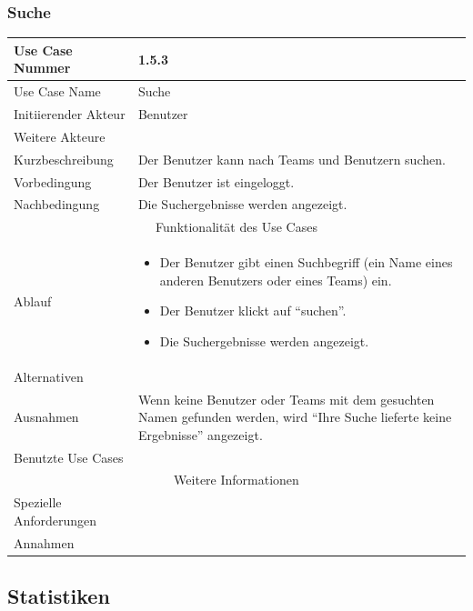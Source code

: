 \documentclass[10pt,a4paper]{article}
\begin{document}
\subsubsection{Suche}
	\begin{tabular}{|l|p{.5\linewidth}|}
	\hline Use Case Nummer & 1.5.3 \\ 
	\hline Use Case Name & Suche \\ 
	\hline Initiierender Akteur & Benutzer \\
	\hline Weitere Akteure &  \\
	\hline Kurzbeschreibung & Der Benutzer kann nach Teams und Benutzern suchen. \\
	\hline Vorbedingung & Der Benutzer ist eingeloggt. \\
	\hline Nachbedingung & Die Suchergebnisse werden angezeigt. \\
	\hline \multicolumn{2}{|c|}{Funktionalität des Use Cases}\\
	\hline Ablauf & \begin{itemize}
		\item Der Benutzer gibt einen Suchbegriff (ein Name eines anderen Benutzers oder eines Teams) ein.
		\item Der Benutzer klickt auf ``suchen''.
		\item Die Suchergebnisse werden angezeigt.
	\end{itemize} \\
	\hline Alternativen &  \\
	\hline Ausnahmen & Wenn keine Benutzer oder Teams mit dem gesuchten Namen gefunden werden, wird ``Ihre Suche lieferte keine Ergebnisse'' angezeigt. \\
	\hline Benutzte Use Cases &  \\
	\hline \multicolumn{2}{|c|}{Weitere Informationen} \\
	\hline Spezielle Anforderungen &  \\
	\hline Annahmen &  \\
	\hline
	\end{tabular}

\subsection{Statistiken}
\end{document}

